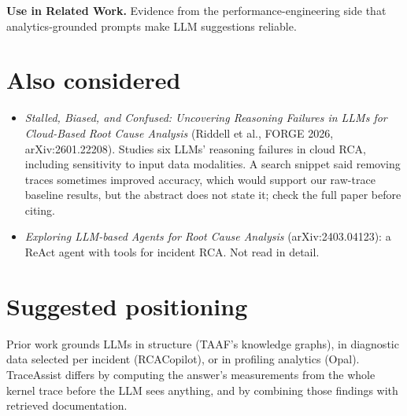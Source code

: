 \documentclass[11pt]{article}
\newcommand{\sysname}{TraceAssist\xspace}
\begin{document}
\textbf{Use in Related Work.} Evidence from the performance-engineering side
that analytics-grounded prompts make LLM suggestions reliable.

\section{Also considered}

\begin{itemize}
  \item \emph{Stalled, Biased, and Confused: Uncovering Reasoning Failures in
        LLMs for Cloud-Based Root Cause Analysis} (Riddell et al., FORGE
        2026, arXiv:2601.22208). Studies six LLMs' reasoning failures in
        cloud RCA, including sensitivity to input data modalities. A
        search snippet said removing traces sometimes improved accuracy,
        which would support our raw-trace baseline results, but the
        abstract does not state it; check the full paper before citing.
  \item \emph{Exploring LLM-based Agents for Root Cause Analysis}
        (arXiv:2403.04123): a ReAct agent with tools for incident RCA. Not
        read in detail.
\end{itemize}

\section{Suggested positioning}

Prior work grounds LLMs in structure (TAAF's knowledge graphs), in
diagnostic data selected per incident (RCACopilot), or in profiling
analytics (Opal). \sysname differs by computing the answer's measurements
from the whole kernel trace before the LLM sees anything, and by combining
those findings with retrieved documentation.
\end{document}
